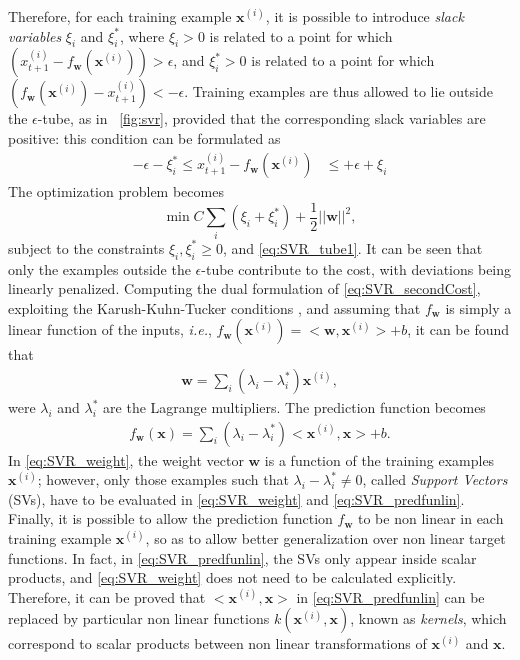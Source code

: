 \documentclass[conference, a4paper]{IEEEtran}
\begin{document}
Therefore, for each training example $\mathbf{x}^{(i)}$, it is possible to introduce \textit{slack variables} $\xi_i$ and $\xi_i^*$, where $\xi_i>0$ is related to a point for which $(x_{t+1}^{(i)}-f_{\mathbf{w}}(\mathbf{x}^{(i)})) > \epsilon$, and $\xi_i^*>0$ is related to a point for which $(f_{\mathbf{w}}(\mathbf{x}^{(i)})-x_{t+1}^{(i)}) < -\epsilon$. 
Training examples are thus allowed to lie outside the $\epsilon$-tube, as in \figurename~\ref{fig:svr}, provided that the corresponding slack variables are positive: this condition can be formulated as
\begin{align}
-\epsilon - \xi_i^*\leq x_{t+1}^{(i)}-f_{\mathbf{w}}(\mathbf{x}^{(i)}) & \leq +\epsilon + \xi_i \label{eq:SVR_tube1}
\end{align}
The optimization problem becomes
\begin{equation}\label{eq:SVR_secondCost}
\min C \sum_i \left(\xi_i+\xi_i^* \right) + \frac{1}{2} ||\mathbf{w}||^2,
\end{equation}
subject to the constraints $\xi_i, \xi_i^* \ge 0$, and \eqref{eq:SVR_tube1}. It can be seen that  only the examples outside
the $\epsilon$-tube contribute to the cost, with deviations being linearly penalized. Computing the dual formulation of \eqref{eq:SVR_secondCost}, exploiting the Karush-Kuhn-Tucker conditions \cite{Karush1939,kuhn1951}, and assuming that $f_\mathbf{w}$ is simply a linear function of the inputs, \emph{i.e.},  $f_\mathbf{w}(\mathbf{x}^{(i)}) = <\mathbf{w}, \mathbf{x}^{(i)}> + b$, it can be found that 
\begin{align}\label{eq:SVR_weight}
\mathbf{w} = \sum_i(\lambda_i-\lambda_i^*)\mathbf{x}^{(i)},
\end{align}
were $\lambda_i$ and $\lambda_i^*$ are the Lagrange multipliers. The prediction function becomes
\begin{align}\label{eq:SVR_predfunlin}
f_\mathbf{w}(\mathbf{x}) = \sum_i (\lambda_i-\lambda_i^*) <\mathbf{x}^{(i)},\mathbf{x}> + b.
\end{align}
In \eqref{eq:SVR_weight}, the weight vector $\mathbf{w}$ is a function of the training examples $\mathbf{x}^{(i)}$; however, only those examples such that $\lambda_i-\lambda_i^* \ne 0$, called \textit{Support Vectors} (SVs), have to be evaluated in \eqref{eq:SVR_weight} and \eqref{eq:SVR_predfunlin}.  
Finally, it is possible to allow the prediction function $f_\mathbf{w}$ to be non linear in each training example $\mathbf{x}^{(i)}$, so as to allow better generalization over non linear target functions. In fact, in \eqref{eq:SVR_predfunlin}, the SVs only appear inside scalar products, and \eqref{eq:SVR_weight} does not need to be calculated explicitly. Therefore, it can be proved that $<\mathbf{x}^{(i)},\mathbf{x}>$ in \eqref{eq:SVR_predfunlin} can be replaced by particular non linear functions $k(\mathbf{x}^{(i)},\mathbf{x})$, known as \textit{kernels}, which correspond to scalar products between non linear transformations of $\mathbf{x}^{(i)}$ and $\mathbf{x}$. 
\end{document}
